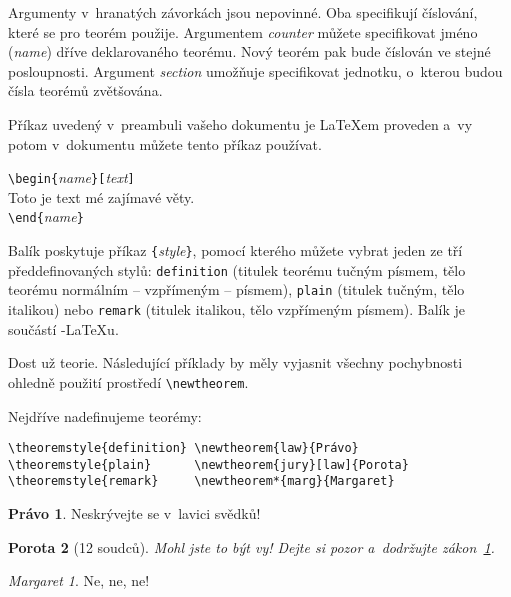 Argumenty v~hranatých závorkách jsou nepovinné. Oba specifikují
číslování, které se pro teorém použije. Argumentem
\emph{counter} můžete specifikovat jméno (\emph{name}) dříve
deklarovaného teorému. Nový teorém pak bude číslován
ve stejné posloupnosti. Argument \emph{section} umožňuje specifikovat
jednotku, o~kterou budou čísla teorémů zvětšována.

Příkaz  uvedený v~preambuli vašeho dokumentu 
je \LaTeX em proveden a~vy potom v~dokumentu můžete tento
příkaz používat.
\begin{code}
\verb|\begin{|\emph{name}\verb|}[|\emph{text}\verb|]|\\
Toto je text mé zajímavé věty.\\
\verb|\end{|\emph{name}\verb|}|     
\end{code}

Balík  poskytuje příkaz
\verb|{|\emph{style}\verb|}|,
pomocí kterého můžete vybrat jeden ze tří předdefinovaných
stylů:
\texttt{definition} (titulek teorému tučným písmem,
  tělo teorému normálním -- vzpřímeným -- písmem),
\texttt{plain} (titulek tučným, tělo italikou) nebo
\texttt{remark} (titulek italikou, tělo vzpřímeným písmem).
Balík  je součástí \AmS-\LaTeX u.

Dost už teorie. Následující příklady
by měly vyjasnit všechny pochybnosti ohledně použití prostředí
\verb|\newtheorem|.

\theoremstyle{definition} \newtheorem{law}{Právo}
\theoremstyle{plain}      \newtheorem{jury}[law]{Porota}
\theoremstyle{remark}     \newtheorem*{marg}{Margaret}

Nejdříve nadefinujeme teorémy:

\begin{verbatim}
\theoremstyle{definition} \newtheorem{law}{Právo}
\theoremstyle{plain}      \newtheorem{jury}[law]{Porota}
\theoremstyle{remark}     \newtheorem*{marg}{Margaret}
\end{verbatim}

\begin{example}
\begin{law} \label{law:box}
Neskrývejte se v~lavici svědků!
\end{law}
\begin{jury}[12 soudců]
Mohl jste to být vy! Dejte
si pozor a~dodržujte
zákon~\ref{law:box}.\end{jury}
\begin{marg}Ne, ne, ne!\end{marg}
\end{example}


